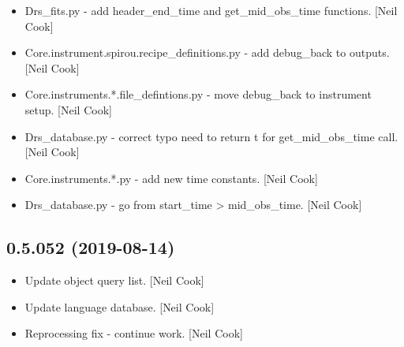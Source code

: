 \documentclass[a4paper,10pt,english]{report}
\begin{document}
\begin{itemize}
\item {} 
Drs\_fits.py - add header\_end\_time and get\_mid\_obs\_time functions.
{[}Neil Cook{]}

\item {} 
Core.instrument.spirou.recipe\_definitions.py - add debug\_back to
outputs. {[}Neil Cook{]}

\item {} 
Core.instruments.*.file\_defintions.py - move debug\_back to instrument
setup. {[}Neil Cook{]}

\item {} 
Drs\_database.py - correct typo need to return t for get\_mid\_obs\_time
call. {[}Neil Cook{]}

\item {} 
Core.instruments.*.py - add new time constants. {[}Neil Cook{]}

\item {} 
Drs\_database.py - go from start\_time \textendash{}\textgreater{} mid\_obs\_time. {[}Neil Cook{]}

\end{itemize}


\subsection{0.5.052 (2019-08-14)}
\label{\detokenize{misc/changelog:id89}}\begin{itemize}
\item {} 
Update object query list. {[}Neil Cook{]}

\item {} 
Update language database. {[}Neil Cook{]}

\item {} 
Reprocessing fix - continue work. {[}Neil Cook{]}

\end{itemize}
\end{document}
